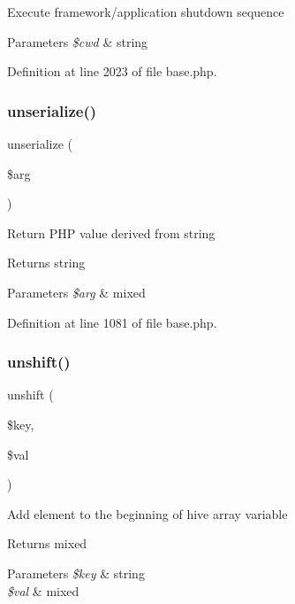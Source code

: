 Execute framework/application shutdown sequence 
\begin{DoxyParams}{Parameters}
{\em \$cwd} & string \\
\hline
\end{DoxyParams}


Definition at line 2023 of file base.\+php.

\hypertarget{class_base_ad07703b75ad394aac9592c2f7684f87e}{}\label{class_base_ad07703b75ad394aac9592c2f7684f87e} 
\subsubsection{\texorpdfstring{unserialize()}{unserialize()}}
{\footnotesize\ttfamily unserialize (\begin{DoxyParamCaption}\item[{}]{\$arg }\end{DoxyParamCaption})}

Return P\+HP value derived from string \begin{DoxyReturn}{Returns}
string 
\end{DoxyReturn}

\begin{DoxyParams}{Parameters}
{\em \$arg} & mixed \\
\hline
\end{DoxyParams}


Definition at line 1081 of file base.\+php.

\hypertarget{class_base_a44e8f53ad45c8f0caa4e438285d08a49}{}\label{class_base_a44e8f53ad45c8f0caa4e438285d08a49} 
\subsubsection{\texorpdfstring{unshift()}{unshift()}}
{\footnotesize\ttfamily unshift (\begin{DoxyParamCaption}\item[{}]{\$key,  }\item[{}]{\$val }\end{DoxyParamCaption})}

Add element to the beginning of hive array variable \begin{DoxyReturn}{Returns}
mixed 
\end{DoxyReturn}

\begin{DoxyParams}{Parameters}
{\em \$key} & string \\
\hline
{\em \$val} & mixed \\
\hline
\end{DoxyParams}


